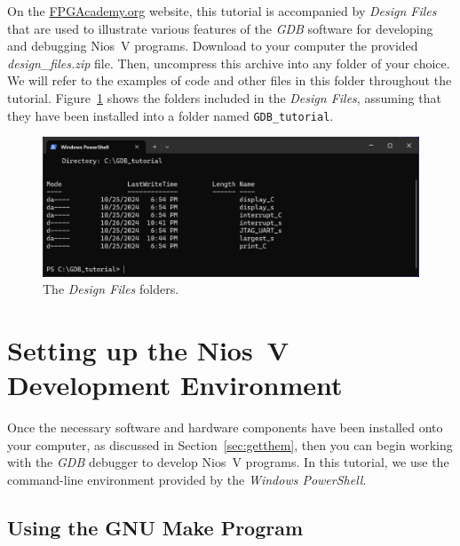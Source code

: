 \documentclass[11pt, twoside, pdftex]{article}
\begin{document}
{On the {\href{https://www.fpgacademy.org/courses.html} {FPGAcademy.org}} website, this
tutorial is accompanied by {\it Design Files} that are used to illustrate various features
of the {\it GDB} software for developing and debugging Nios~V programs. Download to your 
computer the provided {\it design\_files.zip} file. Then, uncompress this archive into any 
folder of your choice. We will refer to the examples of code and other files in this folder 
throughout the tutorial. Figure~\ref{fig:designfiles} shows the folders included in the
{\it Design Files}, assuming that they have been installed into a folder named
\texttt{GDB\_tutorial}.

\begin{figure}[h]
    \begin{center}
        \includegraphics[width=.9\linewidth]{figures/designfiles.png}
        \caption{The {\it Design Files} folders.}
        \label{fig:designfiles}
    \end{center}
\end{figure}

\section{Setting up the Nios~V Development Environment}
\label{sec:setup}

Once the necessary software and hardware components have been installed onto your computer, 
as discussed in Section~\ref{sec:getthem}, then you can begin working with the {\it GDB}
debugger to develop Nios~V programs. In this tutorial, we use the command-line environment 
provided by the {\it Windows PowerShell}.

\subsection{Using the GNU Make Program}

}
\end{document}
